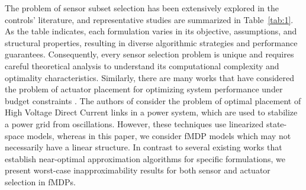\documentclass[twocolumn]{autart}    %
\begin{document}
{The problem of sensor subset selection has been extensively explored in the controls' literature, and representative studies are summarized in Table~\ref{tab:1}. As the table indicates, each formulation varies in its objective, assumptions, and structural properties, resulting in diverse algorithmic strategies and performance guarantees. Consequently, every sensor selection problem is unique and requires careful theoretical analysis to understand its computational complexity and optimality characteristics. Similarly, there are many works that have considered the problem of actuator placement for optimizing system performance under budget constraints \cite{tzoumas2015minimal}. The authors of \cite{fuchs2013actuator} consider the problem of optimal placement of High Voltage Direct Current links in a power system, which are used to stabilize a power grid from oscillations. However, these techniques use linearized state-space models, whereas in this paper, we consider fMDP models which may not necessarily have a linear structure. 
In contrast to several existing works that establish near-optimal approximation algorithms for specific formulations, we present worst-case inapproximability results for both sensor and actuator selection in fMDPs.}


\end{document}
